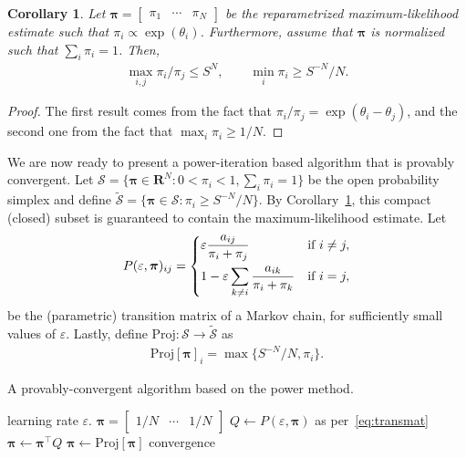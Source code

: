 \documentclass[12pt,a4paper,oneside]{article}
\theoremstyle{plain}
\newtheorem{corollary}{Corollary}
\begin{document}
\begin{corollary}
\label{thm:pidynrange}
Let $\bm{\pi} = \begin{bmatrix} \pi_1 & \cdots & \pi_N \end{bmatrix}$ be the reparametrized maximum-likelihood estimate such that $\pi_i \propto \exp(\theta_i)$.
Furthermore, assume that $\bm{\pi}$ is normalized such that $\sum_i \pi_i = 1$.
Then,
\begin{align*}
\max_{i, j} \pi_i / \pi_j \le S^N,
\qquad \min_i \pi_i \ge S^{-N} / N.
\end{align*}
\end{corollary}
\begin{proof}
The first result comes from the fact that $\pi_i / \pi_j = \exp(\theta_i - \theta_j)$, and the second one from the fact that $\max_i \pi_i \ge 1/N$.
\end{proof}

We are now ready to present a power-iteration based algorithm that is provably convergent.
Let $\mathcal{S} = \{ \bm{\pi} \in \mathbf{R}^N : 0 < \pi_i < 1, \sum_i \pi_i = 1 \}$ be the open probability simplex and define $\widetilde{\mathcal{S}} = \{ \bm{\pi} \in \mathcal{S} : \pi_i \ge S^{-N}/N \}$.
By Corollary~\ref{thm:pidynrange}, this compact (closed) subset is guaranteed to contain the maximum-likelihood estimate.
Let
\begin{align}
\label{eq:transmat}
P(\varepsilon, \bm{\pi})_{ij} =
\begin{dcases}
\varepsilon \frac{a_{ij}}{\pi_i + \pi_j}                    & \text{if } i \ne j, \\
1 - \varepsilon \sum_{k \ne i} \frac{a_{ik}}{\pi_i + \pi_k} & \text{if } i = j,
\end{dcases}
\end{align}
be the (parametric) transition matrix of a Markov chain, for sufficiently small values of $\varepsilon$.
Lastly, define $\text{Proj}: \mathcal{S} \to \widetilde{\mathcal{S}}$ as
\begin{align*}
\text{Proj}[\bm{\pi}]_i = \max \{ S^{-N}/N, \pi_i \}.
\end{align*}

\begin{algorithm}[t]
  \caption{A provably-convergent algorithm based on the power method.}
  \label{alg:lsrpower}
  \begin{algorithmic}[1]
    \Require learning rate $\varepsilon$.
    \State $\bm{\pi} = \begin{bmatrix}1/N & \cdots & 1/N\end{bmatrix}$
    \Repeat
       \label{line:startpow}
        \State $Q \gets P(\varepsilon, \bm{\pi})$ as per~\eqref{eq:transmat}
        \State $\bm{\pi} \gets \bm{\pi}^\top Q$
      \EndFor \label{line:stoppow}
      \State $\bm{\pi} \gets \text{Proj}[\bm{\pi}]$
    \Until convergence
  \end{algorithmic}
\end{algorithm}
\end{document}
